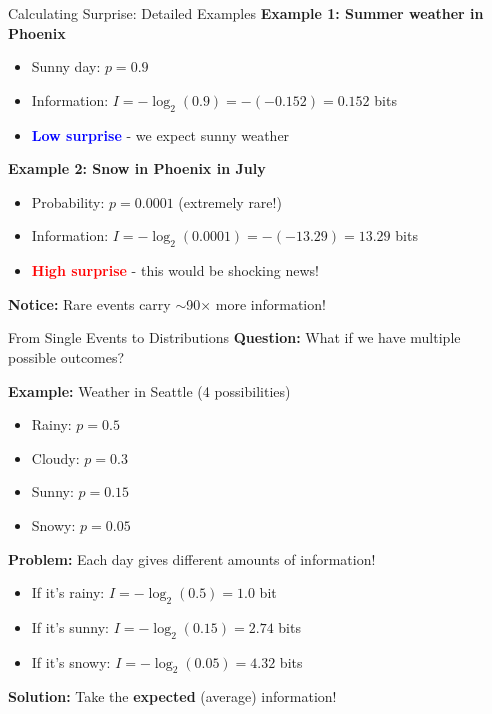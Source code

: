 \documentclass[usenames,dvipsnames]{beamer}
\begin{document}
\begin{frame}{Calculating Surprise: Detailed Examples}
\textbf{Example 1: Summer weather in Phoenix}
\begin{itemize}
\item Sunny day: $p = 0.9$
\pause
\item Information: $I = -\log_2(0.9) = -(-0.152) = 0.152$ bits
\pause
\item \textcolor{blue}{\textbf{Low surprise}} - we expect sunny weather
\end{itemize}

\pause
\textbf{Example 2: Snow in Phoenix in July}
\begin{itemize}
\item Probability: $p = 0.0001$ (extremely rare!)
\pause
\item Information: $I = -\log_2(0.0001) = -(-13.29) = 13.29$ bits
\pause
\item \textcolor{red}{\textbf{High surprise}} - this would be shocking news!
\end{itemize}

\pause
\textbf{Notice:} Rare events carry $\sim$90× more information!
\end{frame}

\begin{frame}{From Single Events to Distributions}
\textbf{Question:} What if we have multiple possible outcomes?

\pause
\textbf{Example:} Weather in Seattle (4 possibilities)
\begin{itemize}
\item Rainy: $p = 0.5$
\item Cloudy: $p = 0.3$  
\item Sunny: $p = 0.15$
\item Snowy: $p = 0.05$
\end{itemize}

\pause
\textbf{Problem:} Each day gives different amounts of information!
\begin{itemize}
\item If it's rainy: $I = -\log_2(0.5) = 1.0$ bit
\item If it's sunny: $I = -\log_2(0.15) = 2.74$ bits  
\item If it's snowy: $I = -\log_2(0.05) = 4.32$ bits
\end{itemize}

\pause
\textbf{Solution:} Take the \textbf{expected} (average) information!
\end{frame}
\end{document}
